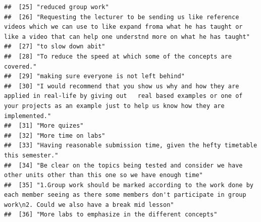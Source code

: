 \documentclass[
]{article}
\begin{document}
\begin{verbatim}
##  [25] "reduced group work"                                                                                                                                                                                                    
##  [26] "Requesting the lecturer to be sending us like reference videos which we can use to like expand froma what he has taught or like a video that can help one understnd more on what he has taught"                        
##  [27] "to slow down abit"                                                                                                                                                                                                     
##  [28] "To reduce the speed at which some of the concepts are covered."                                                                                                                                                        
##  [29] "making sure everyone is not left behind"                                                                                                                                                                               
##  [30] "I would recommend that you show us why and how they are applied in real-life by giving out   real based examples or one of your projects as an example just to help us know how they are implemented."                 
##  [31] "More quizes"                                                                                                                                                                                                           
##  [32] "More time on labs"                                                                                                                                                                                                     
##  [33] "Having reasonable submission time, given the hefty timetable this semester."                                                                                                                                           
##  [34] "Be clear on the topics being tested and consider we have other units other than this one so we have enough time"                                                                                                       
##  [35] "1.Group work should be marked according to the work done by each member seeing as there some members don't participate in group work\n2. Could we also have a break mid lesson"                                        
##  [36] "More labs to emphasize in the different concepts"                                                                                                                                                                      

\end{verbatim}
\end{document}
